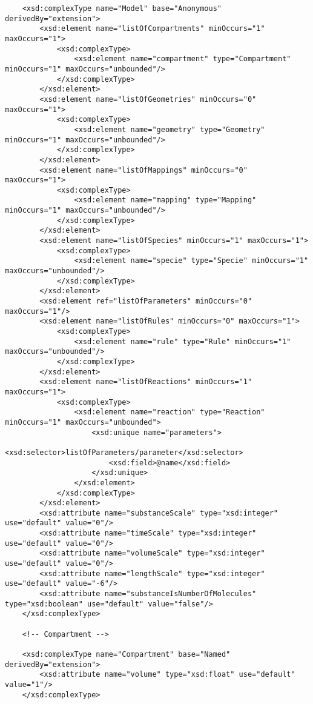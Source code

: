 \documentclass[10pt]{article}
\begin{document}
\begin{small}
\begin{verbatim}
    <xsd:complexType name="Model" base="Anonymous" derivedBy="extension">
        <xsd:element name="listOfCompartments" minOccurs="1" maxOccurs="1">
            <xsd:complexType>
                <xsd:element name="compartment" type="Compartment" minOccurs="1" maxOccurs="unbounded"/>
            </xsd:complexType>
        </xsd:element>
        <xsd:element name="listOfGeometries" minOccurs="0" maxOccurs="1">
            <xsd:complexType>
                <xsd:element name="geometry" type="Geometry" minOccurs="1" maxOccurs="unbounded"/>
            </xsd:complexType>
        </xsd:element>
        <xsd:element name="listOfMappings" minOccurs="0" maxOccurs="1">
            <xsd:complexType>
                <xsd:element name="mapping" type="Mapping" minOccurs="1" maxOccurs="unbounded"/>
            </xsd:complexType>
        </xsd:element>
        <xsd:element name="listOfSpecies" minOccurs="1" maxOccurs="1">
            <xsd:complexType>
                <xsd:element name="specie" type="Specie" minOccurs="1" maxOccurs="unbounded"/>
            </xsd:complexType>
        </xsd:element>
        <xsd:element ref="listOfParameters" minOccurs="0" maxOccurs="1"/>
        <xsd:element name="listOfRules" minOccurs="0" maxOccurs="1">
            <xsd:complexType>
                <xsd:element name="rule" type="Rule" minOccurs="1" maxOccurs="unbounded"/>
            </xsd:complexType>
        </xsd:element>
        <xsd:element name="listOfReactions" minOccurs="1" maxOccurs="1">
            <xsd:complexType>
                <xsd:element name="reaction" type="Reaction" minOccurs="1" maxOccurs="unbounded">
                    <xsd:unique name="parameters">
                        <xsd:selector>listOfParameters/parameter</xsd:selector>
                        <xsd:field>@name</xsd:field>
                    </xsd:unique>
                </xsd:element>
            </xsd:complexType>
        </xsd:element>
        <xsd:attribute name="substanceScale" type="xsd:integer" use="default" value="0"/>
        <xsd:attribute name="timeScale" type="xsd:integer" use="default" value="0"/>
        <xsd:attribute name="volumeScale" type="xsd:integer" use="default" value="0"/>
        <xsd:attribute name="lengthScale" type="xsd:integer" use="default" value="-6"/>
        <xsd:attribute name="substanceIsNumberOfMolecules" type="xsd:boolean" use="default" value="false"/>
    </xsd:complexType>

    <!-- Compartment -->

    <xsd:complexType name="Compartment" base="Named" derivedBy="extension">
        <xsd:attribute name="volume" type="xsd:float" use="default" value="1"/>
    </xsd:complexType>


\end{verbatim}
\end{small}
\end{document}
